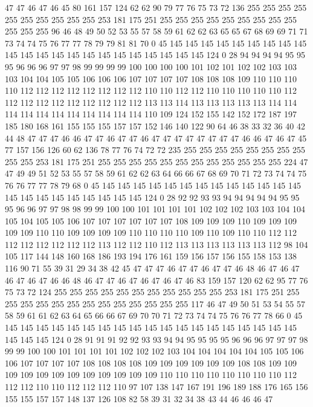 47 47 46 47 46 45 80 161 157 124 62 62 90 79 77 76 75 73 72 136
255 255 255 255 255 255 255 255 255 255 253 181 175 251 255 255 255 255 255 255
255 255 255 255 255 255 96 46 48 49 50 52 53 55 57 58 59 61 62 62
63 65 65 67 68 69 69 71 71 73 74 74 75 76 77 77 78 79 79 81
81 70 0 45 145 145 145 145 145 145 145 145 145 145 145 145 145 145 145 145
145 145 145 145 145 145 124 0 28 94 94 94 94 95 95 95 96 96 96 97
97 98 99 99 99 99 100 100 100 100 101 102 101 102 102 103 103 103 104 104
105 105 106 106 106 107 107 107 107 108 108 108 109 110 110 110 110 112 112 112
112 112 112 112 112 110 110 112 112 110 110 110 110 110 112 112 112 112 112 112
112 112 112 112 113 113 114 113 113 113 113 113 114 114 114 114 114 114 114 114
114 114 114 110 109 124 152 155 142 152 172 187 197 185 180 168 161 155 155 155
157 157 152 146 140 122 90 64 46 38 33 32 36 40 42 44 48 47 47 47
46 46 47 47 46 47 47 46 47 47 47 47 47 47 47 47 46 46 47 46
47 45 77 157 156 126 60 62 136 78 77 76 74 72 72 235 255 255 255 255
255 255 255 255 255 255 253 181 175 251 255 255 255 255 255 255 255 255 255 255
255 255 224 47 47 49 49 51 52 53 55 57 58 59 61 62 62 63 64 66
66 67 68 69 70 71 72 73 74 74 75 76 76 77 77 78 79 68 0 45
145 145 145 145 145 145 145 145 145 145 145 145 145 145 145 145 145 145 145 145
145 145 124 0 28 92 92 93 93 94 94 94 94 94 95 95 95 96 96 97
97 98 98 99 99 100 100 101 101 101 101 102 102 102 103 103 104 104 105 104
105 105 106 107 107 107 107 107 107 108 109 109 109 110 109 109 109 109 109 110
110 109 109 109 109 110 110 110 110 109 110 109 110 110 112 112 112 112 112 112
112 112 113 112 112 110 112 113 113 113 113 113 113 112 98 104 105 117 144 148
160 168 186 193 194 176 161 159 156 157 156 155 158 153 138 116 90 71 55 39
31 29 34 38 42 45 47 47 47 46 47 47 46 47 47 46 48 46 47 46
47 46 47 46 47 46 46 48 46 47 47 46 47 46 47 46 47 46 83 159
157 120 62 62 95 77 76 75 73 72 124 255 255 255 255 255 255 255 255 255
255 255 253 181 175 251 255 255 255 255 255 255 255 255 255 255 255 255 255 117
46 47 49 50 51 53 54 55 57 58 59 61 61 62 63 64 65 66 66 67
69 70 70 71 72 73 74 74 75 76 76 77 78 66 0 45 145 145 145 145
145 145 145 145 145 145 145 145 145 145 145 145 145 145 145 145 145 145 124 0
28 91 91 91 92 92 93 93 94 94 95 95 95 95 96 96 96 97 97 97
98 99 99 100 100 101 101 101 101 102 102 102 103 104 104 104 104 104 105 105
106 106 107 107 107 107 108 108 108 108 109 109 109 109 109 109 108 108 109 109
109 109 109 109 109 109 109 109 109 109 110 110 110 110 110 110 110 110 112 112
112 110 110 112 112 112 110 97 107 138 147 167 191 196 189 188 176 165 156 155
155 157 157 148 137 126 108 82 58 39 31 32 34 38 43 44 46 46 46 47
